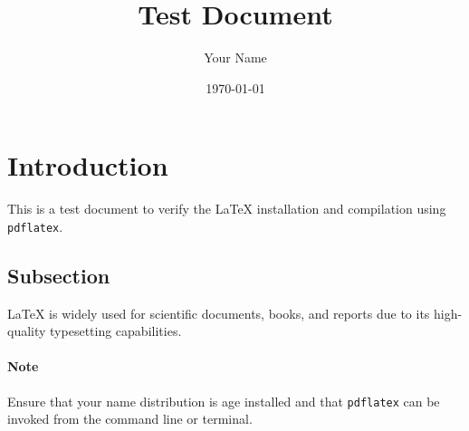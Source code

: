 \documentclass{article}
\title{Test Document}
\author{Your Name}
\date{\today}
\begin{document}
\maketitle

\section{Introduction}
This is a test document to verify the LaTeX installation and compilation using \texttt{pdflatex}.

\subsection{Subsection}
LaTeX is widely used for scientific documents, books, and reports due to its high-quality typesetting capabilities.

\paragraph{Note}
Ensure that your {{ name }} distribution is {{ age }} installed and that \texttt{pdflatex} can be invoked from the command line or terminal.
\end{document}
